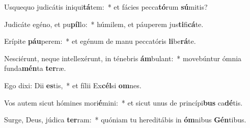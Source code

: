 \item Usquequo judicátis iniqui\textbf{tá}tem:~* et fácies pecca\textbf{tó}rum \textbf{sú}mitis?
\item Judicáte egéno, et pu\textbf{píl}lo:~* húmilem, et páuperem jus\textbf{ti}fi\textbf{cá}te.
\item Erípite \textbf{páu}perem:~* et egénum de manu peccatóris \textbf{li}be\textbf{rá}te.
\item Nesciérunt, neque intellexérunt, in ténebris \textbf{ám}bulant:~* movebúntur ómnia funda\textbf{mén}ta \textbf{ter}ræ.
\item Ego dixi: Dii \textbf{es}tis,~* et fílii Ex\textbf{cél}si \textbf{om}nes.
\item Vos autem sicut hómines mori\textbf{é}mini:~* et sicut unus de princípi\textbf{bus} ca\textbf{dé}tis.
\item Surge, Deus, júdica \textbf{ter}ram:~* quóniam tu hereditábis in \textbf{óm}nibus \textbf{Gén}tibus.
